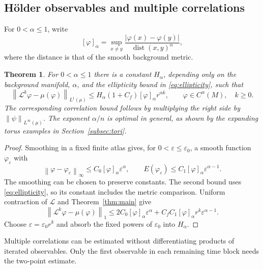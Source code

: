 \documentclass[10pt,a4paper]{amsart}
\newtheorem{theorem}{Theorem}[section]
\newcommand{\Lop}{\mathcal L}
\newcommand{\norm}[1]{\left\lVert #1\right\rVert}
\DeclareMathOperator{\dist}{dist}
\numberwithin{equation}{section}
\begin{document}
\subsection{H\"older observables and multiple correlations}

For $0<\alpha\le1$, write
\[
 [\varphi]_\alpha=\sup_{x\ne y}
 \frac{|\varphi(x)-\varphi(y)|}{\dist(x,y)^\alpha},
\]
where the distance is that of the smooth background metric.

\begin{theorem}\label{thm:holder}
For $0<\alpha\le1$ there is a constant $H_\alpha$, depending only on the background manifold, $\alpha$, and the ellipticity bound in \eqref{eq:ellipticity}, such that
\begin{equation}\label{eq:holder-decay}
 \norm{\Lop^k\varphi-\mu(\varphi)}_{L^1(\mu)}
 \le H_\alpha(1+C_f)[\varphi]_\alpha r^{\alpha k},
 \qquad \varphi\in C^\alpha(M),\quad k\ge0.
\end{equation}
The corresponding correlation bound follows by multiplying the right side by $\norm{\psi}_{L^\infty(\mu)}$. The exponent $\alpha/n$ is optimal in general, as shown by the expanding torus examples in Section~\ref{subsec:tori}.
\end{theorem}

\begin{proof}
Smoothing in a fixed finite atlas gives, for $0<\varepsilon\le\varepsilon_0$, a smooth function $\varphi_\varepsilon$ with
\[
 \norm{\varphi-\varphi_\varepsilon}_\infty
 \le C_0[\varphi]_\alpha\varepsilon^\alpha,
 \qquad
 E(\varphi_\varepsilon)
 \le C_1[\varphi]_\alpha\varepsilon^{\alpha-1}.
\]
The smoothing can be chosen to preserve constants. The second bound uses \eqref{eq:ellipticity}, so its constant includes the metric comparison. Uniform contraction of $\Lop$ and Theorem~\ref{thm:main} give
\[
 \norm{\Lop^k\varphi-\mu(\varphi)}_1
 \le2C_0[\varphi]_\alpha\varepsilon^\alpha
 +C_fC_1[\varphi]_\alpha r^k\varepsilon^{\alpha-1}.
\]
Choose $\varepsilon=\varepsilon_0r^k$ and absorb the fixed powers of $\varepsilon_0$ into $H_\alpha$.
\end{proof}

Multiple correlations can be estimated without differentiating products of iterated observables. Only the first observable in each remaining time block needs the two-point estimate.
\end{document}
